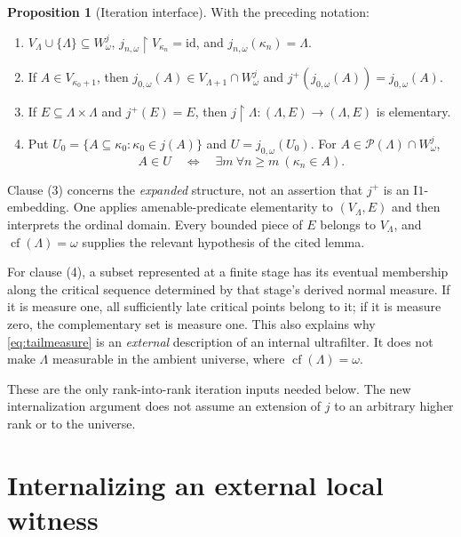 \documentclass[11pt,letterpaper]{article}
\theoremstyle{definition}
\newtheorem{proposition}[definition]{Proposition}
\newcommand{\cf}{\operatorname{cf}}
\newcommand{\id}{\mathrm{id}}
\newcommand{\restr}{\mathbin{\upharpoonright}}
\newcommand{\Ione}{\mathrm{I1}}
\newcommand{\Pow}{\mathcal P}
\begin{document}
\begin{proposition}[Iteration interface]\label{prop:interface}
With the preceding notation:
\begin{enumerate}
\item $V_\Lambda\cup\{\Lambda\}\subseteq W^j_\omega$,
$j_{n,\omega}\restr V_{\kappa_n}=\id$, and
$j_{n,\omega}(\kappa_n)=\Lambda$.
\item If $A\in V_{\kappa_0+1}$, then
$j_{0,\omega}(A)\in V_{\Lambda+1}\cap W^j_\omega$ and
$j^+(j_{0,\omega}(A))=j_{0,\omega}(A)$.
\item If $E\subseteq\Lambda\times\Lambda$ and $j^+(E)=E$, then
$j\restr\Lambda:(\Lambda,E)\to(\Lambda,E)$ is elementary.
\item Put $U_0=\{A\subseteq\kappa_0:\kappa_0\in j(A)\}$ and
$U=j_{0,\omega}(U_0)$. For $A\in\Pow(\Lambda)\cap W^j_\omega$,
\begin{equation}\label{eq:tailmeasure}
 A\in U\quad\Longleftrightarrow\quad
       \exists m\ \forall n\geq m\ (\kappa_n\in A).
\end{equation}
\end{enumerate}
\end{proposition}

Clause (3) concerns the \emph{expanded} structure, not an assertion that
$j^+$ is an $\Ione$-embedding. One applies amenable-predicate elementarity
to $(V_\Lambda,E)$ and then interprets the ordinal domain. Every bounded
piece of $E$ belongs to $V_\Lambda$, and $\cf(\Lambda)=\omega$ supplies
the relevant hypothesis of the cited lemma.

For clause (4), a subset represented at a finite stage has its eventual
membership along the critical sequence determined by that stage's derived
normal measure. If it is measure one, all sufficiently late critical
points belong to it; if it is measure zero, the complementary set is
measure one. This also explains why \eqref{eq:tailmeasure} is an
\emph{external} description of an internal ultrafilter. It does not
make $\Lambda$ measurable in the ambient universe, where
$\cf(\Lambda)=\omega$.

These are the only rank-into-rank iteration inputs needed below. The new
internalization argument does not assume an extension of $j$ to an
arbitrary higher rank or to the universe.

\section{Internalizing an external local witness}\label{sec:internal}
\end{document}
